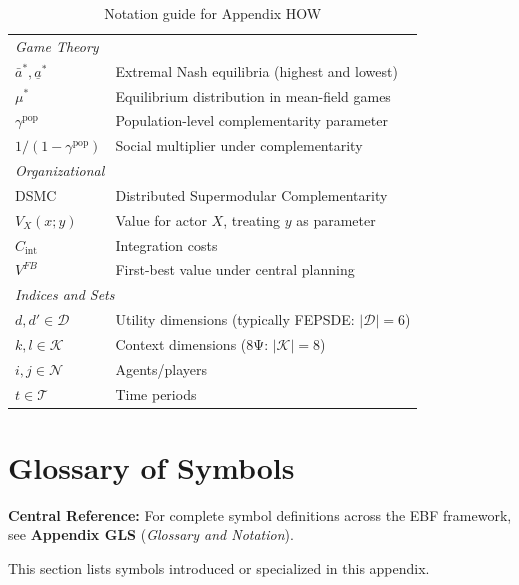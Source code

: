 \begin{table}[h]
\begin{tabular}{p{2.5cm}p{10cm}}
\midrule
\multicolumn{2}{l}{\textit{Game Theory}} \\
$\bar{a}^*, \underline{a}^*$ & Extremal Nash equilibria (highest and lowest) \\
$\mu^*$ & Equilibrium distribution in mean-field games \\
$\gamma^{\text{pop}}$ & Population-level complementarity parameter \\
$1/(1 - \gamma^{\text{pop}})$ & Social multiplier under complementarity \\
\midrule
\multicolumn{2}{l}{\textit{Organizational}} \\
DSMC & Distributed Supermodular Complementarity \\
$V_X(x; y)$ & Value for actor $X$, treating $y$ as parameter \\
$C_{\text{int}}$ & Integration costs \\
$V^{FB}$ & First-best value under central planning \\
\midrule
\multicolumn{2}{l}{\textit{Indices and Sets}} \\
$d, d' \in \mathcal{D}$ & Utility dimensions (typically FEPSDE: $|\mathcal{D}| = 6$) \\
$k, l \in \mathcal{K}$ & Context dimensions (8Ψ: $|\mathcal{K}| = 8$) \\
$i, j \in \mathcal{N}$ & Agents/players \\
$t \in \mathcal{T}$ & Time periods \\
\bottomrule
\end{tabular}
\caption{Notation guide for Appendix HOW}
\label{tab:notation}
\end{table}



\section{Glossary of Symbols}
\label{sec:B-glossary}

\begin{tcolorbox}[colback=blue!5!white, colframe=blue!75!black]
\textbf{Central Reference:} For complete symbol definitions across the EBF 
framework, see \textbf{Appendix GLS} (\textit{Glossary and Notation}).

This section lists symbols introduced or specialized in this appendix.
\end{tcolorbox}

